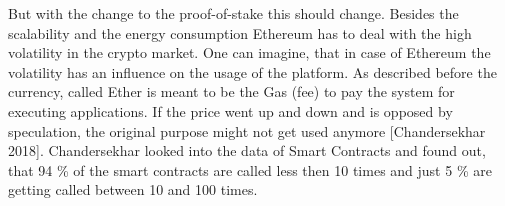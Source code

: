 But with the change to the proof-of-stake this should change.
Besides the scalability and the energy consumption Ethereum has to deal with the high volatility in the crypto market. 
One can imagine, that in case of Ethereum the volatility has an influence on the usage of the platform. 
As described before the currency, called Ether is meant to be the Gas (fee) to pay the system for executing applications. 
If the price went up and down and is opposed by speculation, the original purpose might not get used anymore [Chandersekhar 2018]. 
Chandersekhar looked into the data of Smart Contracts and found out, that 94 \% of the smart contracts are called less then 10 times and just 5 \% are getting called between 10 and 100 times. 
